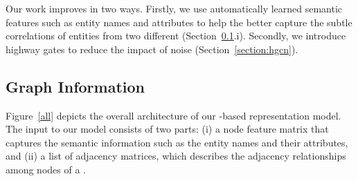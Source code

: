  Our work improves \RGCNs in two ways. Firstly, we use automatically learned semantic features such as entity names and attributes to
 help the \RGCN better capture the subtle correlations of entities from two different \KGs (Section~\ref{section:rgcn}.i).
    Secondly, we introduce highway gates to reduce the impact of noise (Section~\ref{section:hgcn}).




	



	
	\subsection{Graph Information}
	\label{section:rgcn}	


    Figure~\ref{all} depicts the overall architecture of our \RGCN-based \KG representation model. 	
  	The input to our model consists of two parts: (i) a node feature matrix that captures the semantic information such as the entity
  names and their attributes, and (ii) a list of adjacency matrices, which describes the adjacency relationships among nodes of a \KG.



